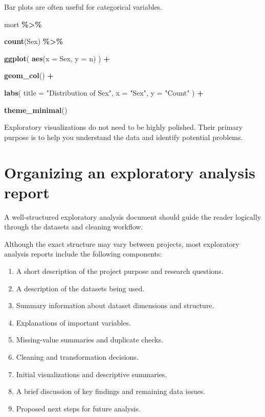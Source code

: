 \documentclass[
  11pt,
  oneside]{book}
\newenvironment{Shaded}{\begin{snugshade}}{\end{snugshade}}
\newcommand{\AttributeTok}[1]{\textcolor[rgb]{0.13,0.29,0.53}{#1}}
\newcommand{\FunctionTok}[1]{\textcolor[rgb]{0.13,0.29,0.53}{\textbf{#1}}}
\newcommand{\NormalTok}[1]{#1}
\newcommand{\SpecialCharTok}[1]{\textcolor[rgb]{0.81,0.36,0.00}{\textbf{#1}}}
\newcommand{\StringTok}[1]{\textcolor[rgb]{0.31,0.60,0.02}{#1}}
\providecommand{\tightlist}{%
  \setlength{\itemsep}{0pt}\setlength{\parskip}{0pt}}
\begin{document}
Bar plots are often useful for categorical variables.

\begin{Shaded}
\begin{Highlighting}[]
\NormalTok{mort }\SpecialCharTok{\%\textgreater{}\%}
  
  \FunctionTok{count}\NormalTok{(Sex) }\SpecialCharTok{\%\textgreater{}\%}
  
  \FunctionTok{ggplot}\NormalTok{(}
    \FunctionTok{aes}\NormalTok{(}\AttributeTok{x =}\NormalTok{ Sex, }\AttributeTok{y =}\NormalTok{ n)}
\NormalTok{  ) }\SpecialCharTok{+}
  
  \FunctionTok{geom\_col}\NormalTok{() }\SpecialCharTok{+}
  
  \FunctionTok{labs}\NormalTok{(}
    \AttributeTok{title =} \StringTok{"Distribution of Sex"}\NormalTok{,}
    \AttributeTok{x =} \StringTok{"Sex"}\NormalTok{,}
    \AttributeTok{y =} \StringTok{"Count"}
\NormalTok{  ) }\SpecialCharTok{+}
  
  \FunctionTok{theme\_minimal}\NormalTok{()}
\end{Highlighting}
\end{Shaded}

Exploratory visualizations do not need to be highly polished. Their primary purpose is to help you understand the data and identify potential problems.

\section{Organizing an exploratory analysis report}\label{organizing-an-exploratory-analysis-report}

A well-structured exploratory analysis document should guide the reader logically through the datasets and cleaning workflow.

Although the exact structure may vary between projects, most exploratory analysis reports include the following components:

\begin{enumerate}
\def\labelenumi{\arabic{enumi}.}
\tightlist
\item
  A short description of the project purpose and research questions.
\item
  A description of the datasets being used.
\item
  Summary information about dataset dimensions and structure.
\item
  Explanations of important variables.
\item
  Missing-value summaries and duplicate checks.
\item
  Cleaning and transformation decisions.
\item
  Initial visualizations and descriptive summaries.
\item
  A brief discussion of key findings and remaining data issues.
\item
  Proposed next steps for future analysis.
\end{enumerate}
\end{document}
